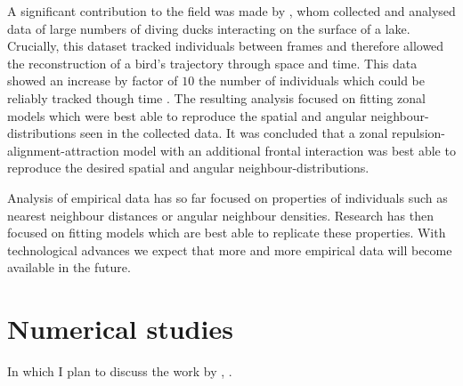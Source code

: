 A significant contribution to the field was made by \citet{lukeman10}, whom collected and analysed data of large numbers of diving ducks interacting on the surface of a lake. Crucially, this dataset tracked individuals between frames and therefore allowed the reconstruction of a bird's trajectory through space and time. This data showed an increase by factor of $10$ the number of individuals which could be reliably tracked though time \citep{lukeman09}. The resulting analysis focused on fitting zonal models which were best able to reproduce the spatial and angular neighbour-distributions seen in the collected data. It was concluded that a zonal repulsion-alignment-attraction model with an additional frontal interaction was best able to reproduce the desired spatial and angular neighbour-distributions.

Analysis of empirical data has so far focused on properties of individuals such as nearest neighbour distances or angular neighbour densities. Research has then focused on fitting models which are best able to replicate these properties. With technological advances we expect that more and more empirical data will become available in the future.

\section{Numerical studies}
\label{sec:numerical_studies}

\color{red} In which I plan to discuss the work by \citet{mann11}, \citet{ballerini}. \color{black}
